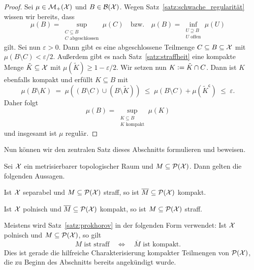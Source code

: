 \documentclass[../thesis/thesis.tex]{subfiles}
\begin{document}
	\begin{proof}
		Sei $\mu \in \mathcal{M}_{+}(\mathcal{X})$ und $B \in \mathcal{B}(\mathcal{X})$. 
		Wegen Satz~\ref{satz:schwache_regularität} wissen wir bereits, dass 
		\[\mu(B) = \sup_{\substack{C \subseteq B \\ C \text{ abgeschlossen}}} \mu(C) 
		\quad \text{bzw.} \quad \mu(B) = \inf_{\substack{U \supseteq B \\ U \text{ offen}}} 
		\mu(U)\]
		gilt. Sei nun $\varepsilon > 0$. Dann gibt es eine abgeschlossene Teilmenge 
		$C \subseteq B \subseteq \mathcal{X}$ mit $\mu(B \setminus C) < \varepsilon/2$. 
		Außerdem gibt es nach Satz~\ref{satz:straffheit} eine kompakte Menge 
		$\tilde{K} \subseteq \mathcal{X}$ mit $\mu(\tilde{K}) \geq 1 - \varepsilon/2$. Wir setzen nun $K \vcentcolon = \tilde{K} \cap C$. Dann ist $K$ ebenfalls kompakt und 
		erfüllt $K \subseteq B$ mit 
		\[ \mu(B \setminus K) 
		\; = \; \mu((B \setminus C) \cup (B \setminus \tilde{K})) 
		\; \leq \; \mu(B \setminus C) + \mu(\tilde{K}^{\mathsf{c}}) 
		\; \leq \; \varepsilon \text{.} \]
		Daher folgt 
		\[\mu(B) 
		= \sup_{\substack{K \subseteq B \\ K \text{ kompakt}}} \mu(K)\] 
		und insgesamt ist $\mu$ regulär.
	\end{proof}
	
	Nun können wir den zentralen Satz dieses Abschnitts formulieren und beweisen.
	
	\begin{Satz}[Prokhorov]
		\label{satz:prokhorov}
		Sei $\mathcal{X}$ ein metrisierbarer topologischer Raum und $M \subseteq \mathcal{P}(\mathcal{X})$. Dann gelten die folgenden Aussagen.
		\begin{enumeratethm}
			\item Ist $\mathcal{X}$ separabel und $M \subseteq \mathcal{P}(\mathcal{X})$ straff, so ist $\overline{M} \subseteq \mathcal{P}(\mathcal{X})$ kompakt.
			\item Ist $\mathcal{X}$ polnisch und $\overline{M} \subseteq \mathcal{P}(\mathcal{X})$ kompakt, so ist $M \subseteq \mathcal{P}(\mathcal{X})$ straff.
		\end{enumeratethm}
	\end{Satz}

	\begin{Bemerkung}
		Meistens wird Satz~\ref{satz:prokhorov} in der folgenden Form verwendet: Ist $\mathcal{X}$ polnisch und $M \subseteq \mathcal{P}(\mathcal{X})$, so gilt
		\[ M \text{ ist straff} \quad \iff \quad \overline{M} \text{ ist kompakt} \text{.} \]
		Dies ist gerade die hilfreiche Charakterisierung kompakter Teilmengen von $\mathcal{P}(\mathcal{X})$, die zu Beginn des Abschnitts bereits angekündigt wurde.
	\end{Bemerkung}
	
\end{document}

